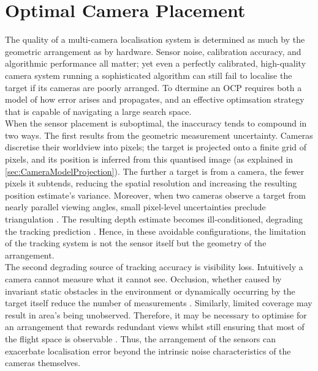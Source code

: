 \chapter{Optimal Camera Placement}
\label{OCP}
The quality of a multi-camera localisation system is determined as much by the geometric arrangement as by hardware. Sensor noise, calibration accuracy, and algorithmic performance all matter; yet even a perfectly calibrated, high-quality camera system running a sophisticated algorithm can still fail to localise the target if its cameras are poorly arranged. To dtermine an \gls{OCP} requires both a model of how error arises and propagates, and an effective optimsation strategy that is capable of navigating a large search space. 
\\

When the sensor placement is suboptimal, the inaccuracy tends to compound in two ways. The first results from the geometric measurement uncertainty. Cameras discretise their worldview into pixels; the target is projected onto a finite grid of pixels, and its position is inferred from this quantised image (as explained in \ref{sec:CameraModelProjection}). The further a target is from a camera, the fewer pixels it subtends, reducing the spatial resolution and increasing the resulting position estimate's variance. Moreover, when two cameras observe a target from nearly parallel viewing angles, small pixel-level uncertainties preclude triangulation \parencite{sharmaAnalysisUncertaintyBounds1998}. The resulting depth estimate becomes ill-conditioned, degrading the tracking prediction \parencite{rahimianOptimalCameraPlacement2017}. Hence, in these avoidable configurations, the limitation of the tracking system is not the sensor itself but the geometry of the arrangement.
\\

The second degrading source of tracking accuracy is visibility loss. Intuitively a camera cannot measure what it cannot see. Occlusion, whether caused by invariant static obstacles in the environment or dynamically occurring by the target itself reduce the number of measurements \parencite{rahimianOptimalCameraPlacement2017}. Similarly, limited coverage may result in area's being unobserved. Therefore, it may be necessary to optimise for an arrangement that rewards redundant views whilst still ensuring that most of the flight space is observable \parencite{aissaouiDesigningCameraPlacement2018}. Thus, the arrangement of the sensors can exacerbate localisation error beyond the intrinsic noise characteristics of the cameras themselves. 
\\

